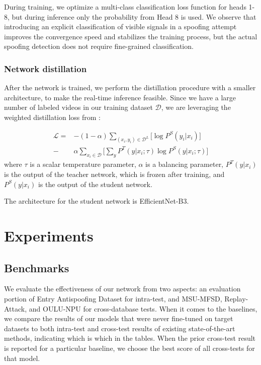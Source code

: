 \documentclass[10pt,twocolumn,letterpaper]{article}
\begin{document}
During training, we optimize a multi-class classification loss function for heads 1-8, but during inference only the probability from Head 8 is used. We observe that introducing an explicit classification of visible signals in a spoofing attempt improves the convergence speed and stabilizes the training process, but the actual spoofing detection does not require fine-grained classification. 

\subsubsection{Network distillation}

After the network is trained, we perform the distillation procedure with a smaller architecture, to make the real-time inference feasible. Since we have a large number of labeled videos in our training dataset $\mathcal{D}$, we are leveraging the weighted distillation loss from \cite{big-self-supervised}:

\begin{equation}
\begin{aligned}
    \mathcal{L} = & -(1-\alpha) \sum_{(x_i, y_i) \in \mathcal{D}^L} \Big[\log \mathit{P}^S(y_i|x_i)\Big] \\
    - & \alpha \sum_{x_i \in \mathcal{D}} \Big[ 
    \sum_y \mathit{P}^T(y|x_i;\tau)\log \mathit{P}^S(y|x_i;\tau)
    \Big]
\end{aligned}
\end{equation}
where $\tau$ is a scalar temperature parameter, $\alpha$ is a balancing parameter, $\mathit{P}^T(y|x_i)$ is the output of the teacher network, which is frozen after training, and $\mathit{P}^S(y|x_i)$ is the output of the student network.

The architecture for the student network is EfficientNet-B3\cite{efficientnet}. 


\section{Experiments}

\subsection{Benchmarks}

We evaluate the effectiveness of our network from two aspects: an evaluation portion of Entry Antispoofing Dataset for intra-test, and MSU-MFSD, Replay-Attack, and OULU-NPU for cross-database tests. When it comes to the baselines, we compare the results of our models that were never fine-tuned on target datasets to both intra-test and cross-test results of existing state-of-the-art methods, indicating which is which in the tables. When the prior cross-test result is reported for a particular baseline, we choose the best score of all cross-tests for that model.
\end{document}

